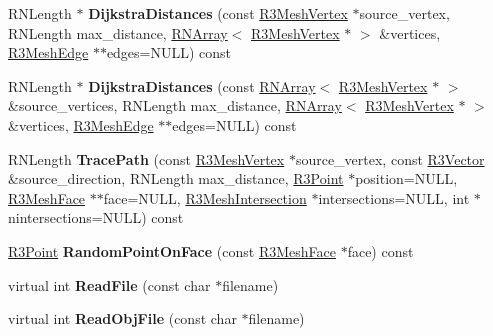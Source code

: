 \begin{DoxyCompactItemize}
\item 
R\+N\+Length $\ast$ {\bfseries Dijkstra\+Distances} (const \hyperlink{class_r3_mesh_vertex}{R3\+Mesh\+Vertex} $\ast$source\+\_\+vertex, R\+N\+Length max\+\_\+distance, \hyperlink{class_r_n_array}{R\+N\+Array}$<$ \hyperlink{class_r3_mesh_vertex}{R3\+Mesh\+Vertex} $\ast$ $>$ \&vertices, \hyperlink{class_r3_mesh_edge}{R3\+Mesh\+Edge} $\ast$$\ast$edges=N\+U\+LL) const \hypertarget{class_r3_mesh_ac9af5895de459dd02e0b68bde1219846}{}\label{class_r3_mesh_ac9af5895de459dd02e0b68bde1219846}

\item 
R\+N\+Length $\ast$ {\bfseries Dijkstra\+Distances} (const \hyperlink{class_r_n_array}{R\+N\+Array}$<$ \hyperlink{class_r3_mesh_vertex}{R3\+Mesh\+Vertex} $\ast$ $>$ \&source\+\_\+vertices, R\+N\+Length max\+\_\+distance, \hyperlink{class_r_n_array}{R\+N\+Array}$<$ \hyperlink{class_r3_mesh_vertex}{R3\+Mesh\+Vertex} $\ast$ $>$ \&vertices, \hyperlink{class_r3_mesh_edge}{R3\+Mesh\+Edge} $\ast$$\ast$edges=N\+U\+LL) const \hypertarget{class_r3_mesh_a2c16805dc98e5388cf816b0804f722f0}{}\label{class_r3_mesh_a2c16805dc98e5388cf816b0804f722f0}

\item 
R\+N\+Length {\bfseries Trace\+Path} (const \hyperlink{class_r3_mesh_vertex}{R3\+Mesh\+Vertex} $\ast$source\+\_\+vertex, const \hyperlink{class_r3_vector}{R3\+Vector} \&source\+\_\+direction, R\+N\+Length max\+\_\+distance, \hyperlink{class_r3_point}{R3\+Point} $\ast$position=N\+U\+LL, \hyperlink{class_r3_mesh_face}{R3\+Mesh\+Face} $\ast$$\ast$face=N\+U\+LL, \hyperlink{struct_r3_mesh_intersection}{R3\+Mesh\+Intersection} $\ast$intersections=N\+U\+LL, int $\ast$nintersections=N\+U\+LL) const \hypertarget{class_r3_mesh_af0cd5ebc8debe3c63da06f35dba97202}{}\label{class_r3_mesh_af0cd5ebc8debe3c63da06f35dba97202}

\item 
\hyperlink{class_r3_point}{R3\+Point} {\bfseries Random\+Point\+On\+Face} (const \hyperlink{class_r3_mesh_face}{R3\+Mesh\+Face} $\ast$face) const \hypertarget{class_r3_mesh_a9df84bce1605591ea546959c70dae57d}{}\label{class_r3_mesh_a9df84bce1605591ea546959c70dae57d}

\item 
virtual int {\bfseries Read\+File} (const char $\ast$filename)\hypertarget{class_r3_mesh_aa779f1e5c56bb872f7e0210d0df07f7c}{}\label{class_r3_mesh_aa779f1e5c56bb872f7e0210d0df07f7c}

\item 
virtual int {\bfseries Read\+Obj\+File} (const char $\ast$filename)\hypertarget{class_r3_mesh_a95f4a7a81be37ee8b647f96787597ca2}{}\label{class_r3_mesh_a95f4a7a81be37ee8b647f96787597ca2}


\end{DoxyCompactItemize}
